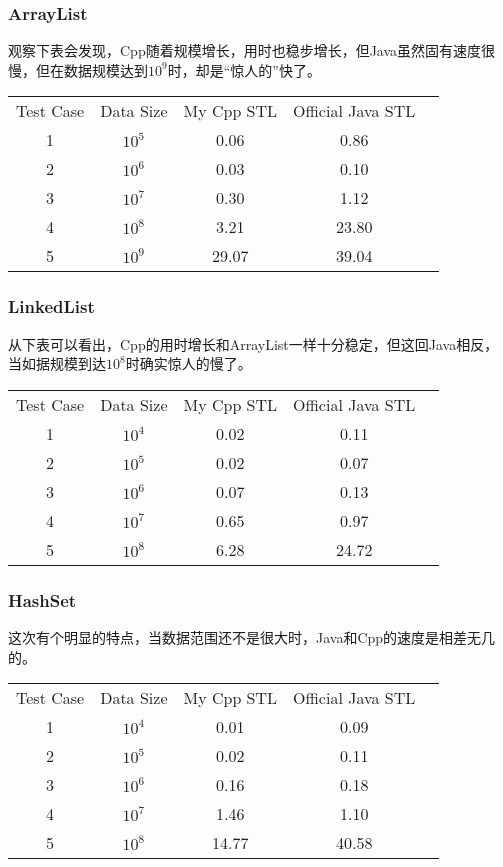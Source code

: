 \subsubsection{ArrayList}

观察下表会发现，Cpp随着规模增长，用时也稳步增长，但Java虽然固有速度很慢，但在数据规模达到$10^9$时，却是“惊人的”快了。

\begin{center}
\begin{tabular}{ccccc}
Test Case&Data Size&My Cpp STL & Official Java STL\\
1&$10^5$&0.06&0.86\\
2&$10^6$&0.03&0.10\\
3&$10^7$&0.30&1.12\\
4&$10^8$&3.21&23.80\\
5&$10^9$&29.07&39.04\\ 
\end{tabular}
\end{center}

\newpage

\subsubsection{LinkedList}

从下表可以看出，Cpp的用时增长和ArrayList一样十分稳定，但这回Java相反，当如据规模到达$10^8$时确实惊人的慢了。

\begin{center}
\begin{tabular}{ccccc}
Test Case&Data Size&My Cpp STL & Official Java STL\\
1&$10^4$&0.02&0.11\\
2&$10^5$&0.02&0.07\\
3&$10^6$&0.07&0.13\\
4&$10^7$&0.65&0.97\\
5&$10^8$&6.28&24.72\\ 
\end{tabular}
\end{center}

\subsubsection{HashSet}

这次有个明显的特点，当数据范围还不是很大时，Java和Cpp的速度是相差无几的。

\begin{center}
\begin{tabular}{ccccc}
Test Case&Data Size&My Cpp STL & Official Java STL\\
1&$10^4$&0.01&0.09\\
2&$10^5$&0.02&0.11\\
3&$10^6$&0.16&0.18\\
4&$10^7$&1.46&1.10\\
5&$10^8$&14.77&40.58\\ 
\end{tabular}
\end{center}

